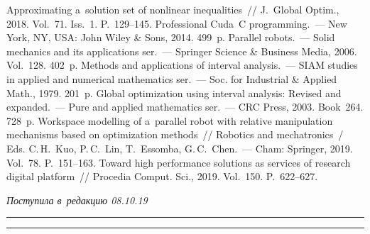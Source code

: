 \begin{multicols}{2}
{\small\frenchspacing
 {%
 \begin{thebibliography}{9}
   Approximating a~solution set of 
nonlinear inequalities~// J.~Global Optim., 2018. Vol.~71. Iss.~1. P.~129--145. 
   Professional Cuda~C programming.~--- New 
York, NY, USA: John Wiley \& Sons, 2014. 499~p.
   Parallel robots.~--- Solid mechanics and its  
applications ser.~--- Springer Science \& Business Media, 2006. Vol.~128. 402~p.
  Methods and applications of interval analysis.~---  SIAM studies 
in applied and numerical mathematics ser.~--- Soc. for 
Industrial \& Applied Math., 1979. 201~p.
   Global optimization using interval 
  analysis: Revised and 
expanded.~--- Pure and applied mathematics ser.~--- CRC Press, 2003. 
Book~264. 728~p.
   Workspace modelling of a~parallel robot 
with relative manipulation mechanisms based on optimization methods~// 
Robotics and mechatronics~/ Eds. C.\,H.~Kuo, P.\,C.~Lin, T.~Essomba, 
G.\,C.~Chen.~--- Cham: Springer, 2019. Vol.~78. P.~151--163.
Toward high performance solutions as services of research digital platform~// 
Procedia Comput. Sci., 2019. Vol.~150. P.~622--627.
\end{thebibliography}

 }
 }

\end{multicols}

\vspace*{-6pt}

\hfill{\small\textit{Поступила в~редакцию 08.10.19}}

\vspace*{8pt}




\hrule

\vspace*{2pt}

\hrule


